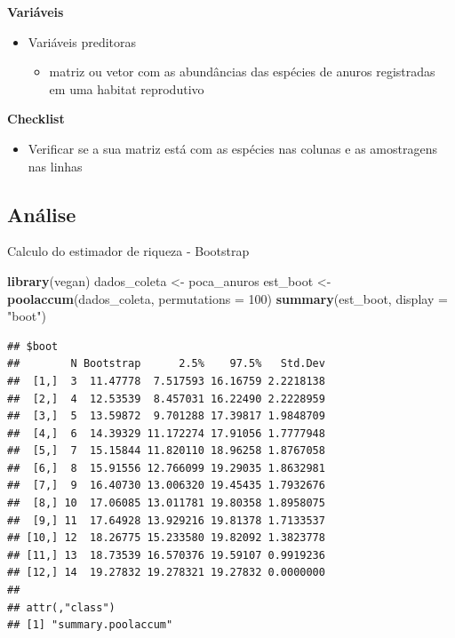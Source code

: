 \documentclass[
]{book}
\newenvironment{Shaded}{\begin{snugshade}}{\end{snugshade}}
\newcommand{\DataTypeTok}[1]{\textcolor[rgb]{0.13,0.29,0.53}{#1}}
\newcommand{\DecValTok}[1]{\textcolor[rgb]{0.00,0.00,0.81}{#1}}
\newcommand{\KeywordTok}[1]{\textcolor[rgb]{0.13,0.29,0.53}{\textbf{#1}}}
\newcommand{\NormalTok}[1]{#1}
\newcommand{\StringTok}[1]{\textcolor[rgb]{0.31,0.60,0.02}{#1}}
\providecommand{\tightlist}{%
  \setlength{\itemsep}{0pt}\setlength{\parskip}{0pt}}
\begin{document}
\textbf{Variáveis}

\begin{itemize}
\tightlist
\item
  Variáveis preditoras

  \begin{itemize}
  \tightlist
  \item
    matriz ou vetor com as abundâncias das espécies de anuros registradas em uma habitat reprodutivo
  \end{itemize}
\end{itemize}

\textbf{Checklist}

\begin{itemize}
\tightlist
\item
  Verificar se a sua matriz está com as espécies nas colunas e as amostragens nas linhas
\end{itemize}

\hypertarget{anuxe1lise-7}{%
\subsection{Análise}\label{anuxe1lise-7}}

Calculo do estimador de riqueza - Bootstrap

\begin{Shaded}
\begin{Highlighting}[]
\KeywordTok{library}\NormalTok{(vegan)}
\NormalTok{dados_coleta <-}\StringTok{ }\NormalTok{poca_anuros}
\NormalTok{est_boot <-}\StringTok{ }\KeywordTok{poolaccum}\NormalTok{(dados_coleta, }\DataTypeTok{permutations =} \DecValTok{100}\NormalTok{)}
\KeywordTok{summary}\NormalTok{(est_boot, }\DataTypeTok{display =} \StringTok{"boot"}\NormalTok{)}
\end{Highlighting}
\end{Shaded}

\begin{verbatim}
## $boot
##        N Bootstrap      2.5%    97.5%   Std.Dev
##  [1,]  3  11.47778  7.517593 16.16759 2.2218138
##  [2,]  4  12.53539  8.457031 16.22490 2.2228959
##  [3,]  5  13.59872  9.701288 17.39817 1.9848709
##  [4,]  6  14.39329 11.172274 17.91056 1.7777948
##  [5,]  7  15.15844 11.820110 18.96258 1.8767058
##  [6,]  8  15.91556 12.766099 19.29035 1.8632981
##  [7,]  9  16.40730 13.006320 19.45435 1.7932676
##  [8,] 10  17.06085 13.011781 19.80358 1.8958075
##  [9,] 11  17.64928 13.929216 19.81378 1.7133537
## [10,] 12  18.26775 15.233580 19.82092 1.3823778
## [11,] 13  18.73539 16.570376 19.59107 0.9919236
## [12,] 14  19.27832 19.278321 19.27832 0.0000000
## 
## attr(,"class")
## [1] "summary.poolaccum"
\end{verbatim}
\end{document}
